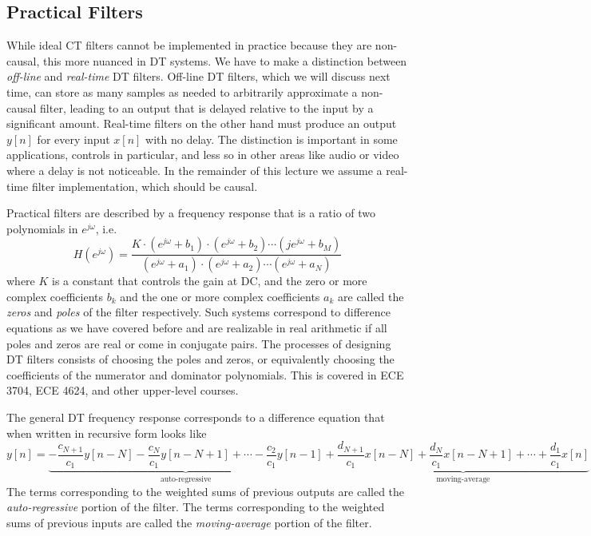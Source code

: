 \subsection{Practical Filters}

While ideal CT filters cannot be implemented in practice because they are non-causal, this more nuanced in DT systems. We have to make a distinction between \emph{off-line} and \emph{real-time} DT filters. Off-line DT filters, which we will discuss next time, can store as many samples as needed to arbitrarily approximate a non-causal filter, leading to an output that is delayed relative to the input by a significant amount. Real-time filters on the other hand must produce an output $y[n]$ for every input $x[n]$ with no delay. The distinction is important in some applications, controls in particular, and less so in other areas like audio or video where a delay is not noticeable. In the remainder of this lecture we assume a real-time filter implementation, which should be causal.

Practical filters are described by a frequency response that is a ratio of two polynomials in $e^{j\omega}$, i.e.
\[
H\left(e^{j\omega}\right) = \frac{K \cdot\left(e^{j\omega} + b_1\right)\cdot\left(e^{j\omega} + b_2\right)\cdots \left(je^{j\omega} + b_M\right)}{\left(e^{j\omega} + a_1\right)\cdot\left(e^{j\omega} + a_2\right)\cdots \left(e^{j\omega} + a_N\right)}
\]
where $K$ is a constant that controls the gain at DC, and the zero or more complex coefficients $b_k$ and the one or more complex coefficients $a_k$ are called the \emph{zeros} and \emph{poles} of the filter respectively. Such systems correspond to difference equations as we have covered before and are realizable in real arithmetic if all poles and zeros are real or come in conjugate pairs. The processes of designing DT filters consists of choosing the poles and zeros, or equivalently choosing the coefficients of the numerator and dominator polynomials. This is covered in ECE 3704, ECE 4624, and other upper-level courses. 

The general DT frequency response corresponds to a difference equation that when written in recursive form looks like
\[
y[n] = \underbrace{-\frac{c_{N+1}}{c_1} y[n-N] -\frac{c_{N}}{c_1}  y[n-N+1] + \cdots -\frac{c_{2}}{c_1} y[n-1]}_{\text{auto-regressive}} + \underbrace{\frac{d_{N+1}}{c_1} x[n-N] + \frac{d_{N}}{c_1} x[n-N+1] + \cdots + \frac{d_1}{c_1} x[n]}_{\text{moving-average}}
\]
The terms corresponding to the weighted sums of previous outputs are called the \emph{auto-regressive} portion of the filter. The terms corresponding to the weighted sums of previous inputs are called the \emph{moving-average} portion of the filter.

